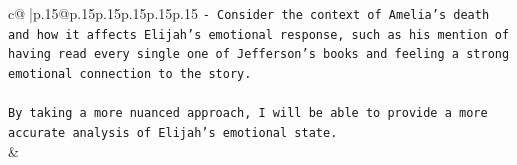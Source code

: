 \documentclass{article}
\begin{document}
{\begin{supertabular}{c@{$\;$}|p{.15\linewidth}@{}p{.15\linewidth}p{.15\linewidth}p{.15\linewidth}p{.15\linewidth}p{.15\linewidth}}
{{{\texttt{{-} Consider the context of Amelia's death and how it affects Elijah's emotional response, such as his mention of having read every single one of Jefferson's books and feeling a strong emotional connection to the story.} \\
\\ 
\texttt{By taking a more nuanced approach, I will be able to provide a more accurate analysis of Elijah's emotional state.} \\
            }
        }
    }
    & \\ \\

\end{supertabular}
}
\end{document}
